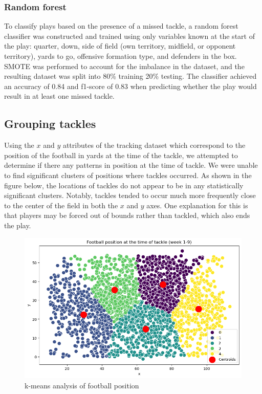 \documentclass[bibtex, sigconf, hyperref={colorlinks=true,linkcolor=blue,urlcolor=blue}]{acmart}
\begin{document}
\subsubsection{Random forest}

To classify plays based on the presence of a missed tackle, a random forest
classifier was constructed and trained using only variables known at the start
of the play: quarter, down, side of field (own territory, midfield, or opponent
territory), yards to go, offensive formation type, and defenders in the box.
SMOTE was performed to account for the imbalance in the dataset, and the
resulting dataset was split into 80\% training 20\% testing. The classifier
achieved an accuracy of 0.84 and f1-score of 0.83 when predicting whether the
play would result in at least one missed tackle.

\subsection{Grouping tackles}

Using the $x$ and $y$ attributes of the tracking dataset which correspond to the
position of the football in yards at the time of the tackle, we attempted to
determine if there any patterns in position at the time of tackle.
We were unable to find significant clusters of positions where tackles
occurred. As shown in the figure below, the locations of tackles do not appear
to be in any statistically significant clusters. Notably, tackles tended to
occur much more frequently close to the center of the field in both the $x$ and
$y$ axes. One explanation for this is that players may be forced out of bounds
rather than tackled, which also ends the play.

\begin{figure}[h]
  \centering
  \includegraphics[width=\linewidth]{k-means}
  \caption{k-means analysis of football position}
\end{figure}
\end{document}

